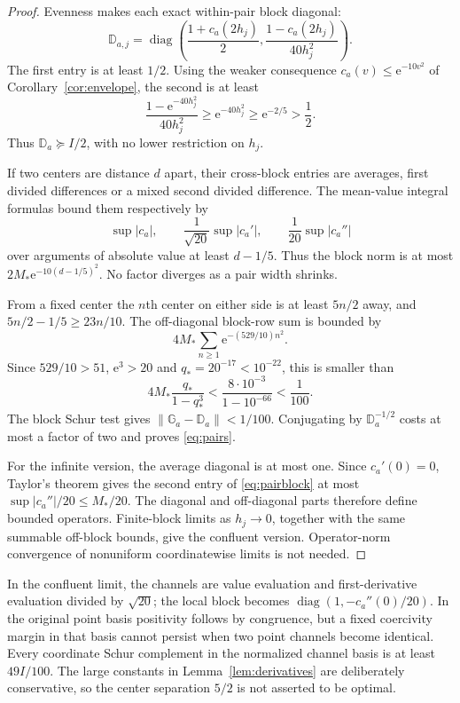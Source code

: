 \documentclass[11pt,letterpaper]{article}
\numberwithin{equation}{section}
\theoremstyle{remark}\newtheorem{remark}[theorem]{Remark}
\newcommand{\ee}{\mathrm e}
\newcommand{\diag}{\operatorname{diag}}
\begin{document}
\begin{proof}
Evenness makes each exact within-pair block diagonal:
\begin{equation}\label{eq:pairblock}
\mathbb D_{a,j}=\diag\left(
\frac{1+c_a(2h_j)}2,
\frac{1-c_a(2h_j)}{40h_j^2}\right).
\end{equation}
The first entry is at least $1/2$. Using the weaker consequence $c_a(v)\le\ee^{-10v^2}$ of Corollary~\ref{cor:envelope}, the second is at least
\[
\frac{1-\ee^{-40h_j^2}}{40h_j^2}\ge\ee^{-40h_j^2}
\ge\ee^{-2/5}>\frac12.
\]
Thus $\mathbb D_a\succeq I/2$, with no lower restriction on $h_j$.

If two centers are distance $d$ apart, their cross-block entries are averages, first divided differences or a mixed second divided difference. The mean-value integral formulas bound them respectively by
\[
\sup|c_a|,\qquad \frac1{\sqrt{20}}\sup|c_a'|,
\qquad \frac1{20}\sup|c_a''|
\]
over arguments of absolute value at least $d-1/5$. Thus the block norm is at most $2M_*\ee^{-10(d-1/5)^2}$. No factor diverges as a pair width shrinks.

From a fixed center the $n$th center on either side is at least $5n/2$ away, and $5n/2-1/5\ge23n/10$. The off-diagonal block-row sum is bounded by
\[
4M_*\sum_{n\ge1}\ee^{-(529/10)n^2}.
\]
Since $529/10>51$, $\ee^3>20$ and $q_*=20^{-17}<10^{-22}$, this is smaller than
\[
4M_*\frac{q_*}{1-q_*^3}
<\frac{8\cdot10^{-3}}{1-10^{-66}}<\frac1{100}.
\]
The block Schur test gives $\|\mathbb G_a-\mathbb D_a\|<1/100$. Conjugating by $\mathbb D_a^{-1/2}$ costs at most a factor of two and proves \eqref{eq:pairs}.

For the infinite version, the average diagonal is at most one. Since $c_a'(0)=0$, Taylor's theorem gives the second entry of \eqref{eq:pairblock} at most $\sup|c_a''|/20\le M_*/20$. The diagonal and off-diagonal parts therefore define bounded operators. Finite-block limits as $h_j\to0$, together with the same summable off-block bounds, give the confluent version. Operator-norm convergence of nonuniform coordinatewise limits is not needed.
\end{proof}

In the confluent limit, the channels are value evaluation and first-derivative evaluation divided by $\sqrt{20}$; the local block becomes $\diag(1,-c_a''(0)/20)$. In the original point basis positivity follows by congruence, but a fixed coercivity margin in that basis cannot persist when two point channels become identical. Every coordinate Schur complement in the normalized channel basis is at least $49I/100$. The large constants in Lemma~\ref{lem:derivatives} are deliberately conservative, so the center separation $5/2$ is not asserted to be optimal.
\end{document}
